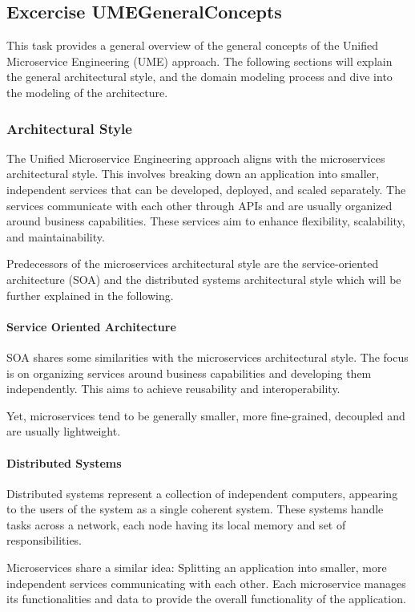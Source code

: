 \subsection{Excercise UMEGeneralConcepts}
\label{sec:ume_general_concepts}
This task provides a general overview of the general concepts of the Unified Microservice Engineering (UME) approach.
The following sections will explain the general architectural style, and the domain modeling process and dive into the modeling of the architecture.

\subsubsection*{Architectural Style}
The Unified Microservice Engineering approach aligns with the microservices architectural style.
This involves breaking down an application into smaller, independent services that can be developed, deployed, and scaled separately.
The services communicate with each other through APIs and are usually organized around business capabilities.
These services aim to enhance flexibility, scalability, and maintainability.

Predecessors of the microservices architectural style are the service-oriented architecture (SOA) and the distributed systems architectural style which will be further explained in the following.

\paragraph*{Service Oriented Architecture}
SOA shares some similarities with the microservices architectural style.
The focus is on organizing services around business capabilities and developing them independently.
This aims to achieve reusability and interoperability.

Yet, microservices tend to be generally smaller, more fine-grained, decoupled and are usually lightweight.

\paragraph*{Distributed Systems}
Distributed systems represent a collection of independent computers, appearing to the users of the system as a single coherent system.
These systems handle tasks across a network, each node having its local memory and set of responsibilities.

Microservices share a similar idea: Splitting an application into smaller, more independent services communicating with each other.
Each microservice manages its functionalities and data to provide the overall functionality of the application.

